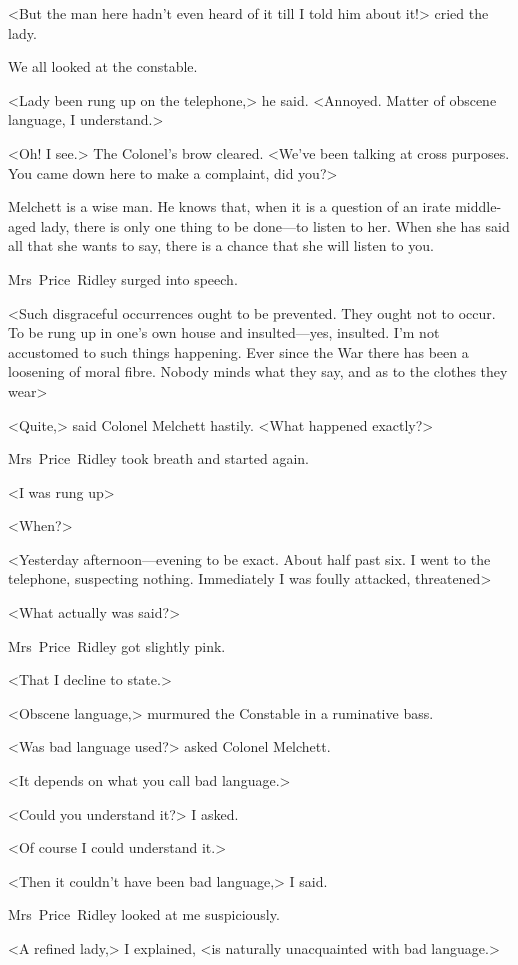 <But the man here hadn't even heard of it till I told him about it!> cried the lady.

We all looked at the constable.

<Lady been rung up on the telephone,> he said. <Annoyed. Matter of obscene language, I understand.>

<Oh! I see.> The Colonel's brow cleared. <We've been talking at cross purposes. You came down here to make a complaint, did you?>

Melchett is a wise man. He knows that, when it is a question of an irate middle-aged lady, there is only one thing to be done—to listen to her. When she has said all that she wants to say, there is a chance that she will listen to you.

Mrs~Price~Ridley surged into speech.

<Such disgraceful occurrences ought to be prevented. They ought not to occur. To be rung up in one's own house and insulted—yes, insulted. I'm not accustomed to such things happening. Ever since the War there has been a loosening of moral fibre. Nobody minds what they say, and as to the clothes they wear\longdash>

<Quite,> said Colonel Melchett hastily. <What happened exactly?>

Mrs~Price~Ridley took breath and started again.

<I was rung up\longdash>

<When?>

<Yesterday afternoon—evening to be exact. About half past six. I went to the telephone, suspecting nothing. Immediately I was foully attacked, threatened\longdash>

<What actually was said?>

Mrs~Price~Ridley got slightly pink.

<That I decline to state.>

<Obscene language,> murmured the Constable in a ruminative bass.

<Was bad language used?> asked Colonel Melchett.

<It depends on what you call bad language.>

<Could you understand it?> I asked.

<Of course I could understand it.>

<Then it couldn't have been bad language,> I said.

Mrs~Price~Ridley looked at me suspiciously.

<A refined lady,> I explained, <is naturally unacquainted with bad language.>

